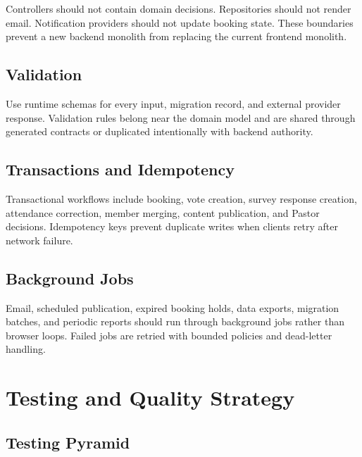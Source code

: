 \documentclass[11pt,a4paper,oneside]{report}
\begin{document}
Controllers should not contain domain decisions. Repositories should not render email. Notification providers should not update booking state. These boundaries prevent a new backend monolith from replacing the current frontend monolith.

\section{Validation}

Use runtime schemas for every input, migration record, and external provider response. Validation rules belong near the domain model and are shared through generated contracts or duplicated intentionally with backend authority.

\section{Transactions and Idempotency}

Transactional workflows include booking, vote creation, survey response creation, attendance correction, member merging, content publication, and Pastor decisions. Idempotency keys prevent duplicate writes when clients retry after network failure.

\section{Background Jobs}

Email, scheduled publication, expired booking holds, data exports, migration batches, and periodic reports should run through background jobs rather than browser loops. Failed jobs are retried with bounded policies and dead-letter handling.

\chapter{Testing and Quality Strategy}

\section{Testing Pyramid}
\end{document}

